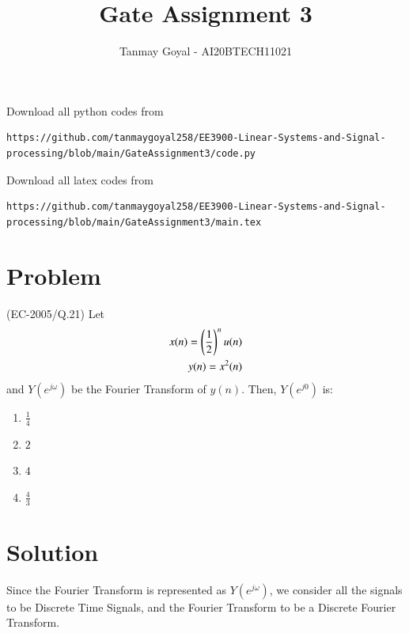 \documentclass[journal,12pt,twocolumn]{IEEEtran}
\begin{document}
\def\putbox#1#2#3{\makebox[0in][l]{\makebox[#1][l]{}\raisebox{\baselineskip}[0in][0in]{\raisebox{#2}[0in][0in]{#3}}}}
     \def\rightbox#1{\makebox[0in][r]{#1}}
     \def\centbox#1{\makebox[0in]{#1}}
     \def\topbox#1{\raisebox{-\baselineskip}[0in][0in]{#1}}
     \def\midbox#1{\raisebox{-0.5\baselineskip}[0in][0in]{#1}}
\vspace{3cm}
\title{Gate Assignment 3}
\author{Tanmay Goyal - AI20BTECH11021}
\maketitle
\newpage
\bigskip
\renewcommand{\thefigure}{\theenumi}
\renewcommand{\thetable}{\theenumi}
Download all python codes from 
\begin{lstlisting}
https://github.com/tanmaygoyal258/EE3900-Linear-Systems-and-Signal-processing/blob/main/GateAssignment3/code.py
\end{lstlisting}
Download all latex codes from 
\begin{lstlisting}
https://github.com/tanmaygoyal258/EE3900-Linear-Systems-and-Signal-processing/blob/main/GateAssignment3/main.tex
\end{lstlisting}
\section{Problem}
(EC-2005/Q.21) Let
\begin{align}
    x(n) = \left(\frac{1}{2}\right)^nu(n)\\
    y(n) = x^2(n)
\end{align}
and $Y(e^{j\omega})$ be the Fourier Transform of $y(n)$. Then, $Y(e^{j0})$ is:
\begin{enumerate}
    \item $\frac{1}{4}$
    \item $2$
    \item $4$
    \item $\frac{4}{3}$
\end{enumerate}
\section{Solution}
Since the Fourier Transform is represented as $Y(e^{j\omega})$, we consider all the signals to be Discrete Time Signals, and the Fourier Transform to be a Discrete Fourier Transform.
\end{document}
